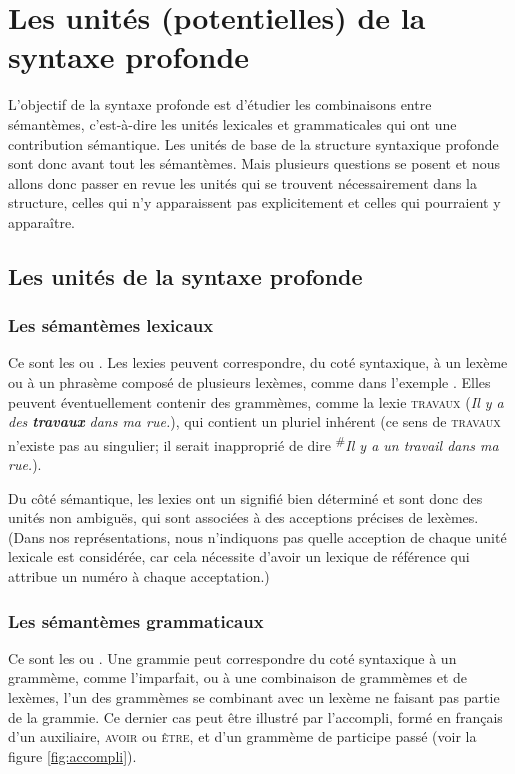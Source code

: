 \section{Les unités (potentielles) de la syntaxe profonde}
\label{sec:13-unites}
L’objectif de la syntaxe profonde est d’étudier les combinaisons entre sémantèmes, c’est-à-dire les unités lexicales et grammaticales qui ont une contribution sémantique. Les unités de base de la structure syntaxique profonde sont donc avant tout les sémantèmes. Mais plusieurs questions se posent et nous allons donc passer en revue les unités qui se trouvent nécessairement dans la structure, celles qui n’y apparaissent pas explicitement et celles qui pourraient y apparaître.

\subsection{Les unités de la syntaxe profonde}

\subsubsection{Les sémantèmes lexicaux} 
Ce sont les  ou . Les lexies peuvent correspondre, du coté syntaxique, à un lexème ou à un phrasème composé de plusieurs lexèmes, comme  dans l’exemple . Elles peuvent éventuellement contenir des grammèmes, comme la lexie \textsc{travaux} (\textit{Il y a des \textbf{travaux} dans ma rue.}), qui contient un pluriel inhérent (ce sens de \textsc{travaux} n'existe pas au singulier; il serait inapproprié de dire \textsuperscript{\#}\textit{Il y a un travail dans ma rue.}).

Du côté sémantique, les lexies ont un signifié bien déterminé et sont donc des unités non ambiguës, qui sont associées à des acceptions précises de lexèmes. (Dans nos représentations, nous n’indiquons pas quelle acception de chaque unité lexicale est considérée, car cela nécessite d’avoir un lexique de référence qui attribue un numéro à chaque acceptation.)

\subsubsection{Les sémantèmes grammaticaux} 
Ce sont les  ou . Une grammie peut correspondre du coté syntaxique à un grammème, comme l’imparfait, ou à une combinaison de grammèmes et de lexèmes, l’un des grammèmes se combinant avec un lexème ne faisant pas partie de la grammie. Ce dernier cas peut être illustré par l’accompli, formé en français d’un auxiliaire, \textsc{avoir} ou \textsc{être}, et d’un grammème de participe passé (voir la figure \ref{fig:accompli}).

